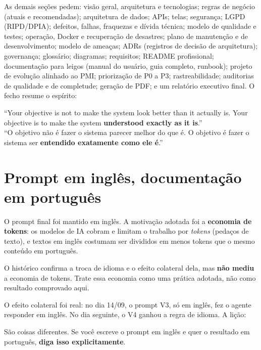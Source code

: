 As demais seções pedem: visão geral, arquitetura e tecnologias; regras de negócio (atuais e recomendadas); arquitetura de dados; APIs; telas; segurança; LGPD (RIPD/DPIA); defeitos, falhas, fraquezas e dívida técnica; modelo de qualidade e testes; operação, Docker e recuperação de desastres; plano de manutenção e de desenvolvimento; modelo de ameaças; ADRs (registros de decisão de arquitetura); governança; glossário; diagramas; requisitos; README profissional; documentação para leigos (manual do usuário, guia completo, runbook); projeto de evolução alinhado ao PMI; priorização de P0 a P3; rastreabilidade; auditorias de qualidade e de completude; geração de PDF; e um relatório executivo final. O fecho resume o espírito:

\begin{analogia}
\enquote{Your objective is not to make the system look better than it actually is. Your objective is to make the system \textbf{understood exactly as it is}.}\\[3pt]
\footnotesize \enquote{O objetivo não é fazer o sistema parecer melhor do que é. O objetivo é fazer o sistema ser \textbf{entendido exatamente como ele é}.}
\end{analogia}

\section{Prompt em inglês, documentação em português}

O prompt final foi mantido em inglês. A motivação adotada foi a \textbf{economia de tokens}: os modelos de IA cobram e limitam o trabalho por \emph{tokens} (pedaços de texto), e textos em inglês costumam ser divididos em menos tokens que o mesmo conteúdo em português.

\begin{atencao}
O histórico confirma a troca de idioma e o efeito colateral dela, mas \textbf{não mediu} a economia de tokens. Trate essa economia como uma prática adotada, não como resultado comprovado aqui.
\end{atencao}

O efeito colateral foi real: no dia 14/09, o prompt V3, só em inglês, fez o agente responder em inglês. No dia seguinte, o V4 ganhou a regra de idioma. A lição:

\begin{conceito}
São coisas diferentes. Se você escreve o prompt em inglês e quer o resultado em português, \textbf{diga isso explicitamente}.
\end{conceito}

